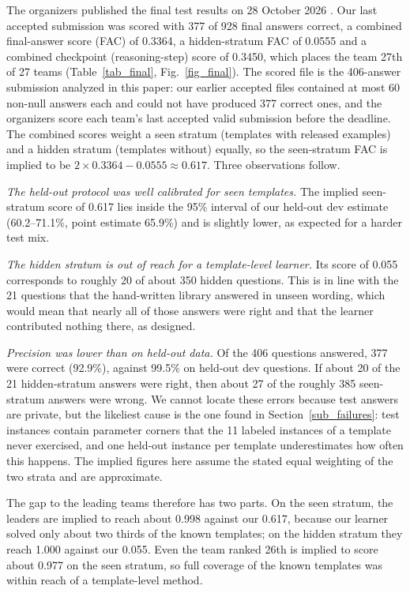 \documentclass[conference]{IEEEtran}
\begin{document}
The organizers published the final test results on 28 October 2026
\cite{finreason2026results}. Our last accepted submission was scored with 377 of
928 final answers correct, a combined final-answer score (FAC) of 0.3364, a
hidden-stratum FAC of 0.0555 and a combined checkpoint (reasoning-step) score of
0.3450, which places the team 27th of 27 teams (Table~\ref{tab_final},
Fig.~\ref{fig_final}). The scored file is the 406-answer submission analyzed in
this paper: our earlier accepted files contained at most 60 non-null answers each
and could not have produced 377 correct ones, and the organizers score each team's
last accepted valid submission before the deadline. The combined scores weight a seen stratum (templates with
released examples) and a hidden stratum (templates without) equally, so the
seen-stratum FAC is implied to be $2\times0.3364-0.0555\approx0.617$. Three
observations follow.

\emph{The held-out protocol was well calibrated for seen templates.} The implied
seen-stratum score of 0.617 lies inside the 95\% interval of our held-out dev
estimate (60.2--71.1\%, point estimate 65.9\%) and is slightly lower, as
expected for a harder test mix.

\emph{The hidden stratum is out of reach for a template-level learner.} Its score
of 0.055 corresponds to roughly 20 of about 350 hidden questions. This is in
line with the 21 questions that the hand-written library answered in unseen
wording, which would mean that nearly all of those answers were right and that
the learner contributed nothing there, as designed.

\emph{Precision was lower than on held-out data.} Of the 406 questions answered,
377 were correct (92.9\%), against 99.5\% on held-out dev questions. If about 20
of the 21 hidden-stratum answers were right, then about 27 of the roughly 385
seen-stratum answers were wrong. We cannot locate these errors because test
answers are private, but the likeliest cause is the one found in
Section~\ref{sub_failures}: test instances contain parameter corners that the 11
labeled instances of a template never exercised, and one held-out instance per
template underestimates how often this happens. The implied figures here assume
the stated equal weighting of the two strata and are approximate.

The gap to the leading teams therefore has two parts. On the seen stratum, the
leaders are implied to reach about 0.998 against our 0.617, because our learner
solved only about two thirds of the known templates; on the hidden stratum they
reach 1.000 against our 0.055. Even the team ranked 26th is implied to score
about 0.977 on the seen stratum, so full coverage of the known templates was
within reach of a template-level method.
\end{document}
